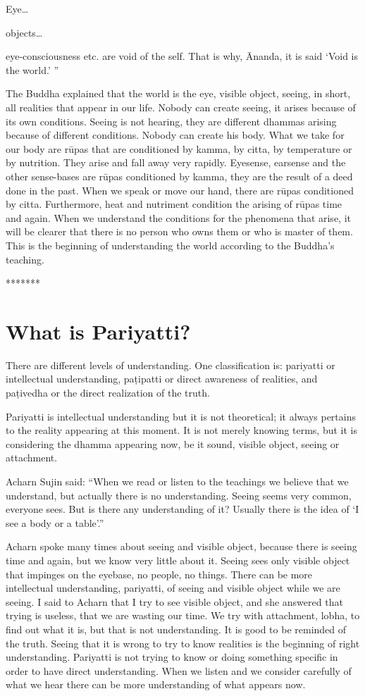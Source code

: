 Eye\ldots{
objects\ldots{eye-consciousness etc. are void of the self. That is why,
Ānanda, it is said `Void is the world.' ''

The Buddha explained that the world is
the eye, visible object, seeing, in short, all realities that appear in
our life. Nobody can create seeing, it arises because of its own
conditions. Seeing is not hearing, they are different dhammas arising
because of different conditions. Nobody can create his body. What we
take for our body are rūpas that are conditioned by kamma, by citta, by
temperature or by nutrition. They arise and fall away very rapidly.
Eyesense, earsense and the other sense-bases are rūpas conditioned by
kamma, they are the result of a deed done in the past. When we speak or
move our hand, there are rūpas conditioned by citta. Furthermore, heat
and nutriment condition the arising of rūpas time and again. When we
understand the conditions for the phenomena that arise, it will be
clearer that there is no person who owns them or who is master of them.
This is the beginning of understanding the world according to the
Buddha's teaching. 

*******



\chapter{What is Pariyatti?}

There are different levels of
understanding. One classification is: pariyatti or intellectual
understanding, paṭipatti or direct awareness of realities, and paṭivedha
or the direct realization of the truth. 

Pariyatti is intellectual understanding
but it is not theoretical; it always pertains to the reality appearing
at this moment. It is not merely knowing terms, but it is considering
the dhamma appearing now, be it sound, visible object, seeing or
attachment. 

Acharn Sujin said: ``When we read or
listen to the teachings we believe that we understand, but actually
there is no understanding. Seeing seems very common, everyone sees. But
is there any understanding of it? Usually there is the idea of `I see a
body or a table'.''

Acharn spoke many times about seeing
and visible object, because there is seeing time and again, but we know
very little about it. Seeing sees only visible object that impinges on
the eyebase, no people, no things. There can be more intellectual
understanding, pariyatti, of seeing and visible object while we are
seeing. I said to Acharn that I try to see visible object, and she
answered that trying is useless, that we are wasting our time. We try
with attachment, lobha, to find out what it is, but that is not
understanding. It is good to be reminded of the truth. Seeing that it is
wrong to try to know realities is the beginning of right understanding.
Pariyatti is not trying to know or doing something specific in order to
have direct understanding. When we listen and we consider carefully of
what we hear there can be more understanding of what appears now. 

}}
